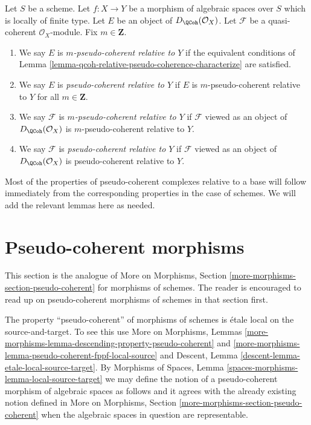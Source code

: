 \begin{definition}
\label{definition-relative-pseudo-coherence}
Let $S$ be a scheme. Let $f : X \to Y$ be a morphism of
algebraic spaces over $S$ which is locally of finite type.
Let $E$ be an object of $D_\QCoh(\mathcal{O}_X)$. Let $\mathcal{F}$ be a
quasi-coherent $\mathcal{O}_X$-module. Fix $m \in \mathbf{Z}$.
\begin{enumerate}
\item We say $E$ is {\it $m$-pseudo-coherent relative to $Y$}
if the equivalent conditions of
Lemma \ref{lemma-qcoh-relative-pseudo-coherence-characterize} are satisfied.
\item We say $E$ is {\it pseudo-coherent relative to $Y$}
if $E$ is $m$-pseudo-coherent relative to $Y$ for all $m \in \mathbf{Z}$.
\item We say $\mathcal{F}$ is {\it $m$-pseudo-coherent relative to $Y$} if
$\mathcal{F}$ viewed as an object of $D_\QCoh(\mathcal{O}_X)$ is
$m$-pseudo-coherent relative to $Y$.
\item We say $\mathcal{F}$ is {\it pseudo-coherent relative to $Y$} if
$\mathcal{F}$ viewed as an object of $D_\QCoh(\mathcal{O}_X)$ is
pseudo-coherent relative to $Y$.
\end{enumerate}
\end{definition}

\noindent
Most of the properties of pseudo-coherent complexes relative to a base
will follow immediately from the corresponding properties in the case
of schemes. We will add the relevant lemmas here as needed.


















\section{Pseudo-coherent morphisms}
\label{section-pseudo-coherent}

\noindent
This section is the analogue of
More on Morphisms, Section \ref{more-morphisms-section-pseudo-coherent}
for morphisms of schemes. The reader is encouraged to read up
on pseudo-coherent morphisms of schemes in that section first.

\medskip\noindent
The property ``pseudo-coherent'' of morphisms of schemes is
\'etale local on the source-and-target. To see this use
More on Morphisms,
Lemmas \ref{more-morphisms-lemma-descending-property-pseudo-coherent} and
\ref{more-morphisms-lemma-pseudo-coherent-fppf-local-source}
and
Descent, Lemma \ref{descent-lemma-etale-local-source-target}.
By
Morphisms of Spaces,
Lemma \ref{spaces-morphisms-lemma-local-source-target}
we may define the notion of a pseudo-coherent morphism of algebraic spaces as
follows and it agrees with the already existing notion defined in
More on Morphisms, Section \ref{more-morphisms-section-pseudo-coherent}
when the algebraic spaces in question are representable.

